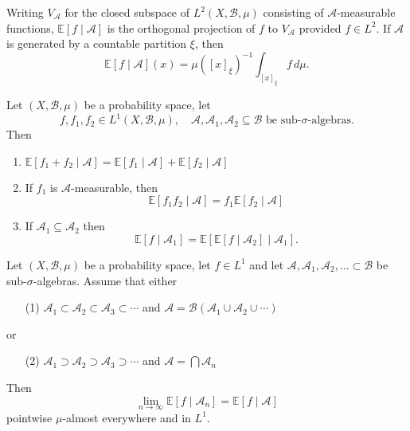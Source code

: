 \documentclass{article}
\begin{document}
\begin{remark}
  Writing $V_\mathcal{A}$ for the closed subspace of $L^2(X, \mathcal{B},\mu)$ consisting of $\mathcal{A}$-measurable functions, $\mathbb{E}[f \mid \mathcal{A}]$ is the orthogonal projection of $f$ to $V_\mathcal{A}$ provided $f \in L^2$.
  If $\mathcal{A}$ is generated by a countable partition $\xi$, then
  \begin{equation*}
    \mathbb{E}[f \mid \mathcal{A}] (x) = \mu([x]_\xi)^{-1} \int_{[x]_\xi}\! f \, d\mu.
  \end{equation*}
\end{remark}
\begin{thm}
  Let $(X,\mathcal{B},\mu)$ be a probability space, let
  \begin{equation*}
    f,f_1,f_2 \in L^1(X, \mathcal{B},\mu), \quad \mathcal{A}, \mathcal{A}_1, \mathcal{A}_2 \subseteq \mathcal{B} \text{ be sub-$\sigma$-algebras.}
  \end{equation*}
  Then
  \begin{enumerate}[label=(\arabic*)]
    \item $\mathbb{E}[f_1+f_2 \mid \mathcal{A}] = \mathbb{E}[f_1 \mid \mathcal{A}] + \mathbb{E}[f_2 \mid \mathcal{A}]$
    \item If $f_1$ is $\mathcal{A}$-measurable, then
      \begin{equation*}
        \mathbb{E}[f_1 f_2 \mid \mathcal{A}] = f_1 \mathbb{E}[f_2 \mid \mathcal{A}]
      \end{equation*}
    \item If $\mathcal{A}_1 \subseteq \mathcal{A}_2$ then
      \begin{equation*}
        \mathbb{E}[f \mid \mathcal{A}_1] = \mathbb{E}[ \mathbb{E} [f \mid \mathcal{A}_2] \mid \mathcal{A}_1].
      \end{equation*}
  \end{enumerate}
\end{thm}
\begin{thm}
  Let $(X, \mathcal{B},\mu)$ be a probability space, let $f \in L^1$ and let $\mathcal{A}, \mathcal{A}_1, \mathcal{A}_2, \dotsc \subset \mathcal{B}$ be sub-$\sigma$-algebras.
  Assume that either
  \begin{itemize}
    \item[(1)] $\mathcal{A}_1 \subset \mathcal{A}_2 \subset \mathcal{A}_3 \subset \dotsb$ and $\mathcal{A} = \mathcal{B}(\mathcal{A}_1 \cup \mathcal{A}_2 \cup \dotsb)$
  \end{itemize}
  or
  \begin{itemize}
    \item[(2)] $\mathcal{A}_1 \supset \mathcal{A}_2 \supset \mathcal{A}_3 \supset \dotsb$ and $\mathcal{A} = \bigcap \mathcal{A}_n$
  \end{itemize}
  Then
  \begin{equation*}
    \lim_{n\to \infty} \mathbb{E}[f \mid \mathcal{A}_n] = \mathbb{E}[f \mid \mathcal{A}]
  \end{equation*}
  pointwise $\mu$-almost everywhere and in $L^1$.
\end{thm}
\end{document}

